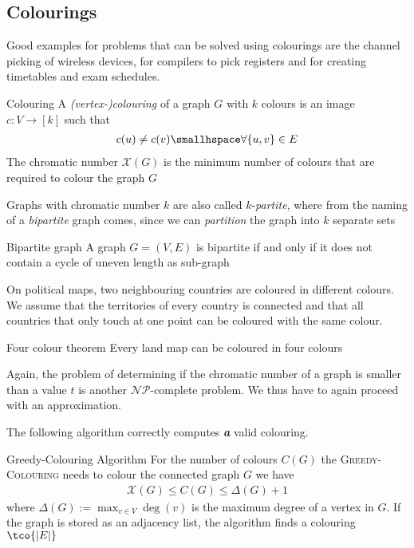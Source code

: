 \newpage
\subsection{Colourings}
Good examples for problems that can be solved using colourings are the channel picking of wireless devices, for compilers to pick registers and for creating timetables and exam schedules.

\begin{definition}[]{Colouring}
    A \textit{(vertex-)colouring} of a graph $G$ with $k$ colours is an image $c: V \rightarrow [k]$ such that
    \begin{align*}
        c(u) \neq c(v) \smallhspace \forall \{u, v\} \in E
    \end{align*}
    The chromatic number $\mathscr{X}(G)$ is the minimum number of colours that are required to colour the graph $G$
\end{definition}
Graphs with chromatic number $k$ are also called $k$-\textit{partite}, where from the naming of a \textit{bipartite} graph comes, since we can \textit{partition} the graph into $k$ separate sets
\begin{theorem}[]{Bipartite graph}
    A graph $G = (V, E)$ is bipartite if and only if it does not contain a cycle of uneven length as sub-graph
\end{theorem}
On political maps, two neighbouring countries are coloured in different colours.
We assume that the territories of every country is connected and that all countries that only touch at one point can be coloured with the same colour.
\begin{theorem}[]{Four colour theorem}
    Every land map can be coloured in four colours
\end{theorem}
Again, the problem of determining if the chromatic number of a graph is smaller than a value $t$ is another $\mathcal{N}\mathcal{P}$-complete problem. We thus have to again proceed with an approximation.

The following algorithm correctly computes \textit{\textbf{a}} valid colouring.
\begin{theorem}[]{Greedy-Colouring Algorithm}
    For the number of colours $C(G)$ the \textsc{Greedy-Colouring} needs to colour the connected graph $G$ we have
    \begin{align*}
        \mathscr{X}(G) \leq C(G) \leq \Delta(G) + 1
    \end{align*}
    where $\Delta(G) := \max_{v\in V}\deg(v)$ is the maximum degree of a vertex in $G$. If the graph is stored as an adjacency list, the algorithm finds a colouring $\tco{|E|}$
\end{theorem}

